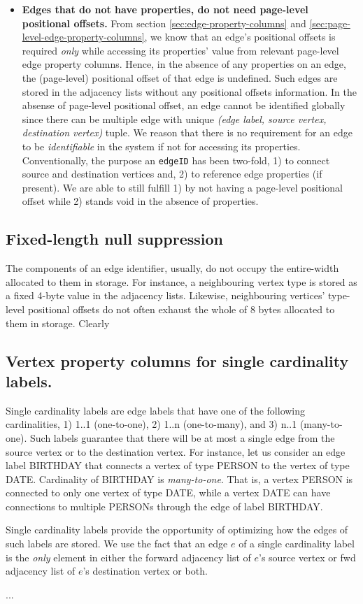 \begin{itemize}
    \item \textbf{Edges that do not have properties, do not need page-level positional offsets.} From section \ref{sec:edge-property-columns} and \ref{sec:page-level-edge-property-columns}, we know that an edge's positional offsets is required \emph{only} while accessing its properties' value from relevant page-level edge property columns. Hence, in the absence of any properties on an edge, the (page-level) positional offset of that edge is undefined. Such edges are stored in the adjacency lists without any positional offsets information. In the absense of page-level positional offset, an edge cannot be identified globally since there can be multiple edge with unique \emph{(edge label, source vertex, destination vertex)} tuple. We reason that there is no requirement for an edge to be \emph{identifiable} in the system if not for accessing its properties. Conventionally, the purpose an  \texttt{edgeID} has been two-fold, 1) to connect source and destination vertices and, 2) to reference edge properties (if present). We are able to still fulfill 1) by not having a page-level positional offset while 2) stands void in the absence of properties. 
	
\end{itemize}

\subsection{Fixed-length null suppression}

The components of an edge identifier, usually, do not occupy the entire-width allocated to them in storage. For instance, a neighbouring vertex type is stored as a fixed 4-byte value in the adjacency lists. Likewise, neighbouring vertices' type-level positional offsets do not often exhaust the whole of 8 bytes allocated to them in storage. Clearly 


\subsection{Vertex property columns for single cardinality labels.}

Single cardinality labels are edge labels that have one of the following cardinalities, 1) 1..1 (one-to-one), 2) 1..n (one-to-many), and 3) n..1 (many-to-one). Such labels guarantee that there will be at most a single edge from the source vertex or to the destination vertex. For instance, let us consider an edge label BIRTHDAY that connects a vertex of type PERSON to the vertex of type DATE. Cardinality of BIRTHDAY is \emph{many-to-one}. That is, a vertex PERSON is connected to only one vertex of type DATE, while a vertex DATE can have connections to multiple PERSONs through the edge of label BIRTHDAY.

Single cardinality labels provide the opportunity of optimizing how the edges of such labels are stored. We use the fact that an edge $e$ of a single cardinality label is the \emph{only} element in either the forward adjacency list of $e$'s source vertex or \gls{fwd} adjacency list of $e$'s destination vertex or both. 

...
